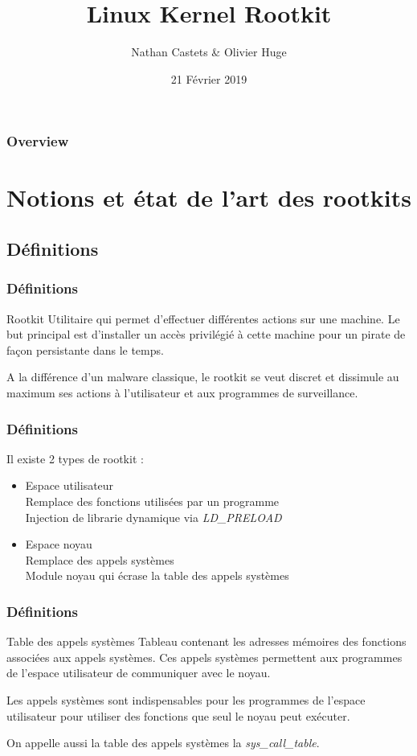 \documentclass{beamer}
\title[Linux Kernel Rootkit]{Linux Kernel Rootkit}
\author{Nathan Castets \& Olivier Huge}
\institute[UBX]{Université de Bordeaux}
\date{21 Février 2019}
\begin{document}
\begin{frame}
\titlepage
\end{frame}

\begin{frame}
\frametitle{Overview}
\tableofcontents
\end{frame}

\section{Notions et état de l'art des rootkits}
\subsection{Définitions}

\begin{frame}
\frametitle{Définitions}
\begin{block}{Rootkit}
Utilitaire qui permet d'effectuer différentes actions sur une machine. Le but principal est d'installer un accès privilégié à cette machine pour un pirate de façon persistante dans le temps.
\end{block}
\medskip
A la différence d'un malware classique, le rootkit se veut discret et dissimule au maximum ses actions à l'utilisateur et aux programmes de surveillance.
\end{frame}

\begin{frame}
\frametitle{Définitions}
Il existe 2 types de rootkit :
\begin{itemize}
\item 	Espace utilisateur\\
	Remplace des fonctions utilisées par un programme\\
	Injection de librarie dynamique via \textit{LD\_PRELOAD}
\item	Espace noyau\\
	Remplace des appels systèmes\\
	Module noyau qui écrase la table des appels systèmes
\end{itemize}
\end{frame}

\begin{frame}
\frametitle{Définitions}
\begin{block}{Table des appels systèmes}
Tableau contenant les adresses mémoires des fonctions associées aux appels systèmes. Ces appels systèmes permettent aux programmes de l'espace utilisateur de communiquer avec le noyau.
\end{block}
\medskip
Les appels systèmes sont indispensables pour les programmes de l'espace utilisateur pour utiliser des fonctions que seul le noyau peut exécuter.

On appelle aussi la table des appels systèmes la \textit{sys\_call\_table}.
\end{frame}
\end{document}
